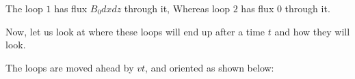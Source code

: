 \documentclass[11pt,a4paper]{scrartcl}
\begin{document}
\begin{solution}
\begin{center}
\begin{tikzpicture}[x=0.75pt,y=0.75pt,yscale=-1,xscale=1]
\end{tikzpicture}  
\end{center}
The loop $1$ has flux $B_0 dx dz$ through it, Whereas loop $2$ has flux $0$ through it.\par
Now, let us look at where these loops will end up after a time $t$ and how they will look.\par
The loops are moved ahead by $vt$, and oriented as shown below: \par
\begin{center}

\begin{tikzpicture}[x=0.75pt,y=0.75pt,yscale=-1,xscale=1]


\end{tikzpicture}
\end{center}
\end{solution}
\end{document}
